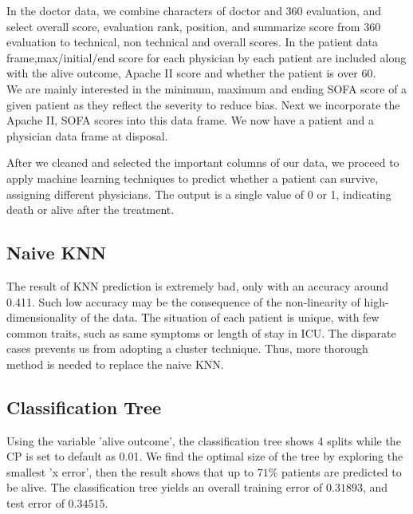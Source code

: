 \documentclass{article}
\begin{document}
In the doctor data, we combine characters of doctor and 360 evaluation, and select overall score, evaluation rank, position, and summarize score from 360 evaluation to technical, non technical and overall scores. In the patient data frame,max/initial/end score for each physician by each patient are included along with the alive outcome, Apache II score and whether the patient is over 60.\\

We are mainly interested in the minimum, maximum and ending SOFA score of a given patient as they reflect the severity to reduce bias. Next we incorporate the Apache II, SOFA scores into this data frame. We now have a patient and a physician data frame at disposal. 

  After we cleaned and selected the important columns of our data, we proceed to apply machine learning techniques to predict whether a patient can survive, assigning different physicians. The output is a single value of 0 or 1, indicating death or alive after the treatment. 


\subsection{Naive KNN}

The result of KNN prediction \cite{KNN} is extremely bad, only with an accuracy around 0.411. Such low accuracy may be the consequence of the non-linearity of high-dimensionality of the data. The situation of each patient is unique, with few common traits, such as same symptoms or length of stay in ICU. The disparate cases prevents us from adopting a cluster technique. Thus, more thorough method is needed to replace the naive KNN.  
  
\subsection{Classification Tree}

Using the variable 'alive outcome', the classification tree \cite{BreimanL} shows 4 splits while the CP is set to default as 0.01. We find the optimal size of the tree by exploring the smallest 'x error', then the result shows that up to $71\%$ patients are predicted to be alive. The classification tree yields an overall training error of $0.31893$, and test error of $0.34515$.
\end{document}
